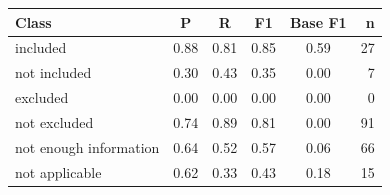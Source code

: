 \begin{tabular}{lccccr}
\hline
Class & P & R & F1 & Base F1 & n \\
\hline
included & 0.88 & 0.81 & 0.85 & 0.59 & 27 \\
not included & 0.30 & 0.43 & 0.35 & 0.00 & 7 \\
excluded & 0.00 & 0.00 & 0.00 & 0.00 & 0 \\
not excluded & 0.74 & 0.89 & 0.81 & 0.00 & 91 \\
not enough information & 0.64 & 0.52 & 0.57 & 0.06 & 66 \\
not applicable & 0.62 & 0.33 & 0.43 & 0.18 & 15 \\
\hline
\end{tabular}
